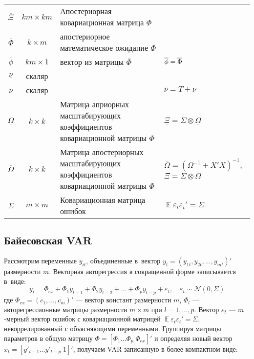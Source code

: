 \documentclass[11pt]{article} %
\DeclareMathOperator{\E}{\mathbb{E}}
\newcommand{\cN}{\mathcal{N}}
\newcommand{\prior}{\underline}
\newcommand{\post}{\overline}
\let\vec\relax
\DeclareMathOperator{\vec}{vec}
\begin{document}
\begin{center}
\begin{tabular}{ccp{6cm}l}
$\post \Xi $ & $km \times km$  & Апостериорная ковариационная матрица $\Phi$& \\
$\post \Phi$ & $k \times m$ & апостериорное математическое ожидание $\Phi$ & \\
$\post \phi$ & $km \times 1$ & вектор из матрицы $\post \Phi$  & $\post \phi = \vec{ \post \Phi}$ \\
$\prior \nu $ & скаляр & & \\
$\post \nu $ & скаляр & & $\post \nu = T + \prior \nu$ \\
\midrule %
$\prior \Omega$ & $k \times k$ & Матрица априорных масштабирующих коэффициентов ковариационной матрицы $\Phi$& $\prior \Xi = \Sigma \otimes \prior \Omega$ \\
$\post \Omega$ & $k \times k$ & Матрица апостериорных масштабирующих коэффициентов ковариационной матрицы $\Phi$&  $\post \Omega = (\prior\Omega^{-1}+ X'X)^{-1}$,  $\post \Xi = \Sigma \otimes \post \Omega$\\
$\Sigma$ & $m \times m$ &Ковариационная матрица ошибок& $\E\varepsilon_t \varepsilon _t'=\Sigma$\\
\bottomrule
\end{tabular}
\end{center}




\subsection{Байесовская VAR}
Рассмотрим переменные $y_{it}$, объединенные в~вектор  $y_{t}=(y_{1t},y_{2t},\ldots, y_{mt})'$ размерности $m$. Векторная авторегрессия в сокращенной форме записывается в~виде:
\begin{equation}
y_t =\Phi_{ex}+ \Phi_1 y_{t-1} + \Phi_2 y_{t-2} +\ldots + \Phi_p y_{t-p} + \varepsilon_t,\quad \varepsilon_t\sim \cN(0,\Sigma)
\end{equation}
где $\Phi_{ex}=(c_1,\ldots ,c_m)'$ --- вектор констант размерности $m$, $\Phi_l$ --– авторегрессионные матрицы размерности $m\times m$ при $l=1, \ldots, p$. Вектор $\varepsilon_t$ --- $m$-мерный вектор ошибок с ковариационной матрицей $\E\varepsilon_t \varepsilon _t'=\Sigma$, некоррелированный с объясняющими переменными.
Группируя матрицы параметров в общую матрицу $\Phi=[\Phi_1 \ldots \Phi_p \; \Phi_{ex}]'$ %
и определяя новый вектор $x_t=[ y'_{t-1} \ldots  y'_{t-p} \; 1]'$, получаем VAR записанную в более компактном виде:
\end{document}
